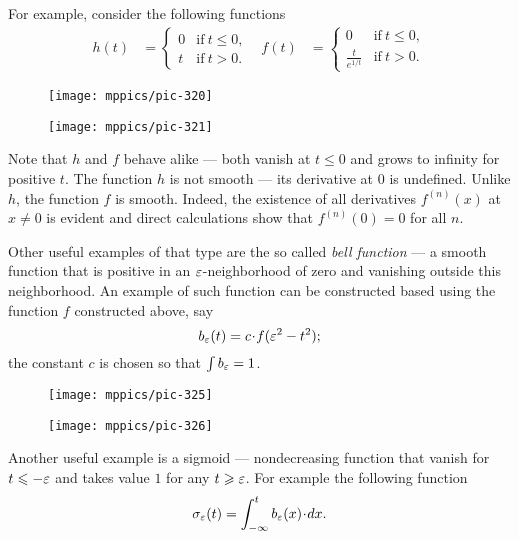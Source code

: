 For example, consider the following functions
\begin{align*}
h(t)&=
\begin{cases}
0&\text{if}\ t\le 0,
\\
t&\text{if}\ t> 0.
\end{cases}
&
f(t)&=
\begin{cases}
0&\text{if}\ t\le 0,
\\
\frac{t}{e^{1\!/\!t}}&\text{if}\ t> 0.
\end{cases}
\end{align*}
\begin{figure}[h]
\begin{minipage}{.48\textwidth}
\centering
\texttt{[image: mppics/pic-320]}
\end{minipage}\hfill
\begin{minipage}{.48\textwidth}
\centering
\texttt{[image: mppics/pic-321]}
\end{minipage}
\end{figure}
Note that $h$ and $f$ behave alike ---
both vanish at $t\le 0$ and grows to infinity for positive $t$.
The function $h$ is not smooth --- its derivative at $0$ is undefined.
Unlike $h$, the function $f$ is smooth.
Indeed, the existence of all derivatives $f^{(n)}(x)$ at $x\ne 0$ is evident and direct calculations show that $f^{(n)}(0)=0$ for all $n$.

Other useful examples of that type are the so called \emph{bell function} --- a smooth function that is positive in an $\varepsilon$-neighborhood of zero and vanishing outside this neighborhood.
An example of such function can be constructed based using the function $f$ constructed above, say 
\[b_\eps(t)=c\cdot f(\eps^2-t^2);\]
the constant $c$ is chosen so that $\int b_\varepsilon=1$.

\begin{figure}[h!]
\begin{minipage}{.48\textwidth}
\centering
\texttt{[image: mppics/pic-325]}
\end{minipage}\hfill
\begin{minipage}{.48\textwidth}
\centering
\texttt{[image: mppics/pic-326]}
\end{minipage}
\end{figure}

Another useful example is a sigmoid --- nondecreasing function that vanish for $t\leqslant -\varepsilon$ and takes value $1$ for any $t\geqslant \varepsilon$.
For example the following function \label{page:sigma-function}
\[\sigma_\eps(t)
=
\int_{-\infty}^t b_\eps(x)\cdot dx.\]


